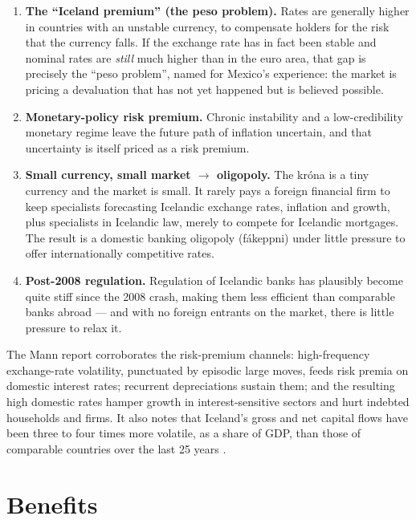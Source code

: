 \documentclass[11pt,a4paper]{article}
\begin{document}
\begin{enumerate}
  \item \textbf{The ``Iceland premium'' (the peso problem).} Rates are
  generally higher in countries with an unstable currency, to compensate
  holders for the risk that the currency falls. If the exchange rate has in
  fact been stable and nominal rates are \emph{still} much higher than in the
  euro area, that gap is precisely the ``peso problem'', named for Mexico's
  experience: the market is pricing a devaluation that has not yet happened
  but is believed possible.
  \item \textbf{Monetary-policy risk premium.} Chronic instability and a
  low-credibility monetary regime leave the future path of inflation uncertain,
  and that uncertainty is itself priced as a risk premium.
  \item \textbf{Small currency, small market $\rightarrow$ oligopoly.} The
  króna is a tiny currency and the market is small. It rarely pays a foreign
  financial firm to keep specialists forecasting Icelandic exchange rates,
  inflation and growth, plus specialists in Icelandic law, merely to compete for
  Icelandic mortgages. The result is a domestic banking oligopoly (fákeppni)
  under little pressure to offer internationally competitive rates.
  \item \textbf{Post-2008 regulation.} Regulation of Icelandic banks has
  plausibly become quite stiff since the 2008 crash, making them less efficient
  than comparable banks abroad --- and with no foreign entrants on the market,
  there is little pressure to relax it.
\end{enumerate}

The Mann report corroborates the risk-premium channels: high-frequency
exchange-rate volatility, punctuated by episodic large moves, feeds risk
premia on domestic interest rates; recurrent depreciations sustain them; and
the resulting high domestic rates hamper growth in interest-sensitive sectors
and hurt indebted households and firms. It also notes that Iceland's gross and
net capital flows have been three to four times more volatile, as a share of
GDP, than those of comparable countries over the last 25 years
\citep{mann2026}.

\section{Benefits}
\end{document}
